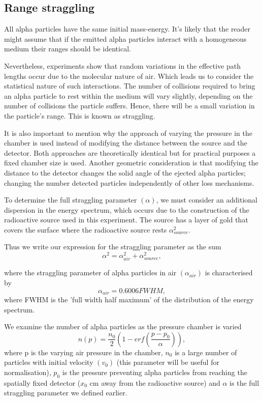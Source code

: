 \documentclass[a4paper]{article}
\begin{document}
\begin{multicols}{2}
\subsection{Range straggling}
All alpha particles have the same initial mass-energy. It's likely that the reader might assume that if the emitted alpha particles interact with a homogeneous medium their ranges should be identical.

Nevertheless, experiments show that random variations in the effective path lengths occur due to the molecular nature of air. Which leads us to consider the statistical nature of such interactions. The number of collisions required to bring an alpha particle to rest within the medium will vary slightly, depending on the number of collisions the particle suffers.
Hence, there will be a small variation in the particle's range. This is known as straggling. \cite{straggling}

It is also important to mention why the approach of varying the pressure in the chamber is used instead of modifying the distance between the source and the detector.
Both approaches are theoretically identical but for practical purposes a fixed chamber size is used. Another geometric consideration is that modifying the distance to the detector changes the solid angle of the ejected alpha particles; changing the number detected particles independently of other loss mechanisms\cite{feedback}.

To determine the full straggling parameter $(\alpha)$, we must consider an additional dispersion in the energy spectrum, which occurs due to the construction of the radioactive source used in this experiment. 
The source has a layer of gold that covers the surface where the radioactive source rests $\alpha_{source}^2$\cite{SPA}. 

Thus we write our expression for the straggling parameter as the sum
\begin{equation} \alpha^2 = \alpha_{air}^2 + \alpha_{source}^2,
\end{equation}

where the straggling parameter of alpha particles in air $(\alpha_{air})$ is characterised by 
\begin{equation} \alpha_{air} = 0.6006 FWHM,
\end{equation}
where FWHM is the 'full width half maximum' of the distribution of the energy spectrum. 

We examine the number of alpha particles as the pressure chamber is varied
\begin{equation} n(p) = \frac{n_0}{2} \left (1- erf \left (\frac{p - p_0}{\alpha}\right )\right ),
\end{equation}
where p is the varying air pressure in the chamber, $n_0$  is a large number of particles with initial velocity $(v_0)$ (this parameter will be useful for normalisation), $p_0$ is the pressure preventing alpha particles from reaching the spatially fixed detector ($x_0$ cm away from the radioactive source) and $\alpha$ is the full straggling parameter we defined earlier.


\end{multicols}
\end{document}
